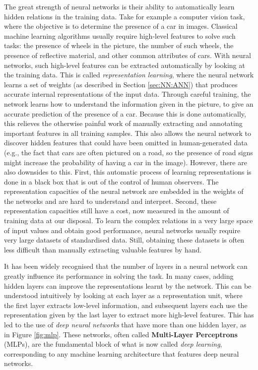 The great strength of neural networks is their ability to automatically learn hidden relations in the training data. Take for example a computer vision task, where the objective is to determine the presence of a car in images. Classical machine learning algorithms usually require high-level features to solve such tasks: the presence of wheels in the picture, the number of such wheels, the presence of reflective material, and other common attributes of cars. With neural networks, such high-level features can be extracted automatically by looking at the training data. This is called \textit{representation learning}, where the neural network learns a set of weights (as described in Section \ref{sec:NN:ANN}) that produces accurate internal representations of the input data. Through careful training, the network learns how to understand the information given in the picture, to give an accurate prediction of the presence of a car. Because this is done automatically, this relieves the otherwise painful work of manually extracting and annotating important features in all training samples. This also allows the neural network to discover hidden features that could have been omitted in human-generated data (e.g., the fact that cars are often pictured on a road, so the presence of road signs might increase the probability of having a car in the image). However, there are also downsides to this. First, this automatic process of learning representations is done in a black box that is out of the control of human observers. The representation capacities of the neural network are embedded in the weights of the networks and are hard to understand and interpret. Second, these representation capacities still have a cost, now measured in the amount of training data at our disposal. To learn the complex relations in a very large space of input values and obtain good performance, neural networks usually require very large datasets of standardised data. Still, obtaining these datasets is often less difficult than manually extracting valuable features by hand. 

It has been widely recognised that the number of layers in a neural network can greatly influence its performance in solving the task. In many cases, adding hidden layers can improve the representations learnt by the network. This can be understood intuitively by looking at each layer as a representation unit, where the first layer extracts low-level information, and subsequent layers each use the representation given by the last layer to extract more high-level features. This has led to the use of \textit{deep neural networks} that have more than one hidden layer, as in Figure \ref{fig:mlp}. These networks, often called \textbf{Multi-Layer Perceptrons} (MLPs), are the fundamental block of what is now called \textit{deep learning}, corresponding to any machine learning architecture that features deep neural networks.  

